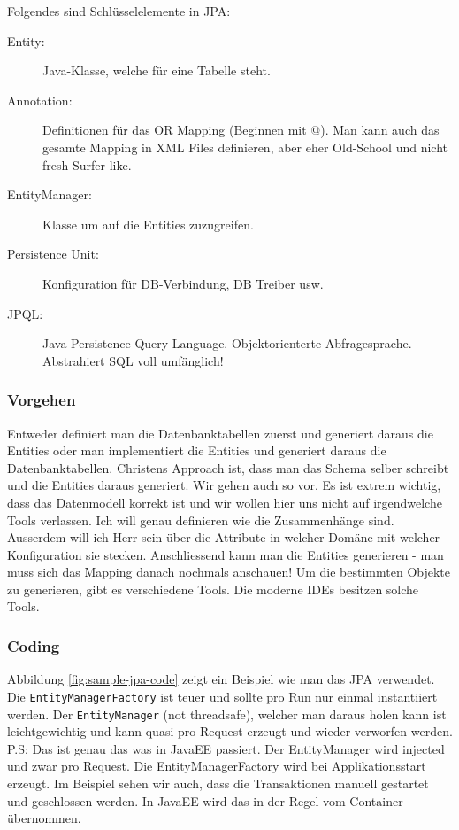 Folgendes sind Schlüsselelemente in JPA:
\begin{description}
	\item[Entity:] Java-Klasse, welche für eine Tabelle steht.
	\item[Annotation:] Definitionen für das OR Mapping (Beginnen mit @). Man kann auch das gesamte Mapping in XML Files definieren, aber eher Old-School und nicht fresh Surfer-like.
	\item[EntityManager:] Klasse um auf die Entities zuzugreifen.
	\item[Persistence Unit:] Konfiguration für DB-Verbindung, DB Treiber usw.
	\item[JPQL:] Java Persistence Query Language. Objektorienterte Abfragesprache. Abstrahiert SQL voll umfänglich!
\end{description}

\subsubsection{Vorgehen}
Entweder definiert man die Datenbanktabellen zuerst und generiert daraus die Entities oder man implementiert die Entities und generiert daraus die Datenbanktabellen. Christens Approach ist, dass man das Schema selber schreibt und die Entities daraus generiert. Wir gehen auch so vor. Es ist extrem wichtig, dass das Datenmodell korrekt ist und wir wollen hier uns nicht auf irgendwelche Tools verlassen. Ich will genau definieren wie die Zusammenhänge sind. Ausserdem will ich Herr sein über die Attribute in welcher Domäne mit welcher Konfiguration sie stecken. Anschliessend kann man die Entities generieren - man muss sich das Mapping danach nochmals anschauen!
Um die bestimmten Objekte zu generieren, gibt es verschiedene Tools. Die moderne IDEs besitzen solche Tools.

\subsubsection{Coding}
Abbildung \ref{fig:sample-jpa-code} zeigt ein Beispiel wie man das JPA verwendet. Die \texttt{EntityManagerFactory} ist teuer und sollte pro Run nur einmal instantiiert werden. Der \texttt{EntityManager} (not threadsafe), welcher man daraus holen kann ist leichtgewichtig und kann quasi pro Request erzeugt und wieder verworfen werden. P.S: Das ist genau das was in JavaEE passiert. Der EntityManager wird injected und zwar pro Request. Die EntityManagerFactory wird bei Applikationsstart erzeugt. Im Beispiel sehen wir auch, dass die Transaktionen manuell gestartet und geschlossen werden. In JavaEE wird das in der Regel vom Container übernommen. 

